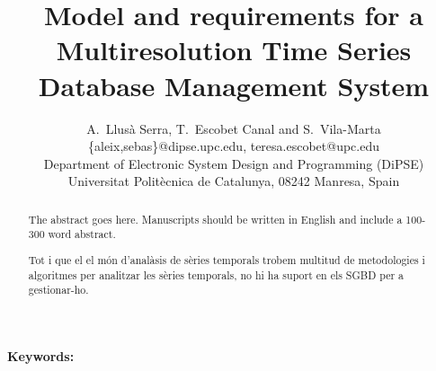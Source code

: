 \documentclass{scrartcl}
\title{
  Model and requirements for a Multiresolution Time Series
  Database Management System }
\author
{
  {
    A.\ Llusà Serra,
    T.\ Escobet Canal
    and S.\ Vila-Marta
  }\\
  {\{aleix,sebas\}@dipse.upc.edu, teresa.escobet@upc.edu}\\
  {Department of Electronic System Design and Programming (DiPSE)}\\
  {Universitat Politècnica de Catalunya, 08242 Manresa, Spain}
}
\begin{document}
\maketitle


\begin{abstract}
The abstract goes here.
Manuscripts should be written in English and include a 100-300 word abstract.

Tot i que el el món d'analàsis de sèries temporals trobem multitud de metodologies i algoritmes per analitzar les sèries temporals, no hi ha suport en els SGBD per a gestionar-ho.
\end{abstract}

{\bfseries Keywords:} 















\printbibliography{}
\end{document}
